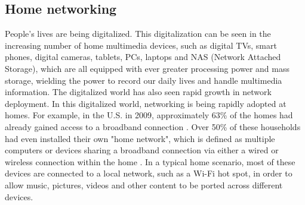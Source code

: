 
\subsection{Home networking}
People's lives are being digitalized. This digitalization can be seen in the
increasing number of home multimedia devices, such as digital TVs, smart
phones, digital cameras, tablets, PCs, laptops and NAS (Network Attached
Storage), which are all equipped with ever greater processing power and mass
storage, wielding the power to record our daily lives and handle multimedia
information. The digitalized world has also seen rapid growth in network
deployment.  In this digitalized world, networking is being rapidly adopted at
homes. For example, in the U.S. in 2009, approximately 63\% of the homes had
already gained access to a broadband connection \cite{stateofHN}. Over 50\% of
these households had even installed their own "home network", which is defined as
multiple computers or devices sharing a broadband connection via either a wired
or wireless connection within the home \cite{standards-perspective}. In a typical home
scenario, most of these devices are connected to a local network, such as a
Wi-Fi hot spot, in order to allow music, pictures, videos and other content to
be ported across different devices.

